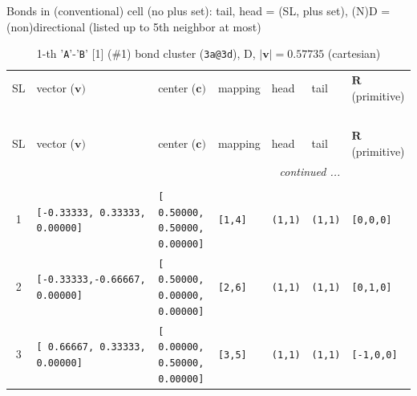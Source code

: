 \documentclass[fleqn,10pt,landscape]{jsarticle}
\begin{document}
\noindent Bonds in (conventional) cell (no plus set): tail, head = (SL, plus set), (N)D = (non)directional (listed up to 5th neighbor at most)

\renewcommand{\arraystretch}{1.6}
\begin{longtable}[l]{cllllll}
\captionsetup{justification=raggedright, singlelinecheck=off}
\caption{1-th '\texttt{A}'-'\texttt{B}' [1] (\#1) bond cluster (\texttt{3a@3d}), D, $|\bm{v}|=0.57735$ (cartesian)}
 \\
 \hline \hline
SL & vector ($\bm{v})$ & center ($\bm{c})$ & mapping & head & tail & $\bm{R}$ (primitive) \\ \hline \endfirsthead

\multicolumn{6}{l}{\tablename\ \thetable{}} \\
 \hline \hline
SL & vector ($\bm{v})$ & center ($\bm{c})$ & mapping & head & tail & $\bm{R}$ (primitive) \\ \hline \endhead

 \hline \hline
\multicolumn{6}{r}{\footnotesize\it continued ...} \\ \endfoot

 \hline \hline
\multicolumn{6}{r}{} \\ \endlastfoot

1 & \texttt{[-0.33333, 0.33333, 0.00000]} & \texttt{[ 0.50000, 0.50000, 0.00000]} & \texttt{[1,4]} & \texttt{(1,1)} & \texttt{(1,1)} & \texttt{[0,0,0]} \\ \hline
2 & \texttt{[-0.33333,-0.66667, 0.00000]} & \texttt{[ 0.50000, 0.00000, 0.00000]} & \texttt{[2,6]} & \texttt{(1,1)} & \texttt{(1,1)} & \texttt{[0,1,0]} \\ \hline
3 & \texttt{[ 0.66667, 0.33333, 0.00000]} & \texttt{[ 0.00000, 0.50000, 0.00000]} & \texttt{[3,5]} & \texttt{(1,1)} & \texttt{(1,1)} & \texttt{[-1,0,0]} \\
\end{longtable}
\end{document}
